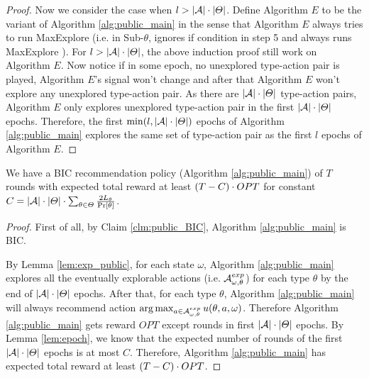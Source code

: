 \begin{proof}
Now we consider the case when $l > |\mathcal{A}| \cdot |\varTheta|$. Define Algorithm $E$ to be the variant of Algorithm \ref{alg:public_main} in the sense that Algorithm $E$ always tries to run MaxExplore (i.e. in Sub-$\theta$, ignores if condition in step 5 and always runs MaxExplore ). For $l > |\mathcal{A}| \cdot |\varTheta|$, the above induction proof still work on Algorithm $E$. Now notice if in some epoch, no unexplored type-action pair is played, Algorithm $E$'s signal won't change and after that Algorithm $E$ won't explore any unexplored type-action pair. As there are $ |\mathcal{A}| \cdot |\varTheta|$ type-action pairs, Algorithm $E$ only explores unexplored type-action pair in the first $ |\mathcal{A}| \cdot |\varTheta|$ epochs. Therefore, the first $\min(l,|\mathcal{A}|\cdot |\varTheta|)$ epochs of Algorithm \ref{alg:public_main} explores the same set of type-action pair as the first $l$ epochs of Algorithm $E$.
\end{proof}

\begin{corollary}
\label{cor:public}
We have a BIC recommendation policy (Algorithm \ref{alg:public_main}) of $T$ rounds with expected total reward at least $\left(T - C \right) \cdot OPT$ for constant $C = |\mathcal{A}| \cdot |\varTheta| \cdot \sum_{\theta\in\varTheta} \frac{2L_{\theta}}{\Pr[\theta]}$. 
\end{corollary}

\begin{proof}
First of all, by Claim \ref{clm:public_BIC}, Algorithm \ref{alg:public_main} is BIC. 

By Lemma \ref{lem:exp_public}, for each state $\omega$, Algorithm \ref{alg:public_main} explores all the eventually explorable actions (i.e. $\mathcal{A}_{\omega,\theta}^{exp}$) for each type $\theta$ by the end of $|\mathcal{A}|\cdot |\varTheta|$ epochs. After that, for each type $\theta$, Algorithm \ref{alg:public_main} will always recommend action $ \arg\max_{a \in \mathcal{A}_{\omega,\theta}^{exp}} u(\theta, a, \omega)$. Therefore Algorithm \ref{alg:public_main} gets reward $OPT$ except rounds in first $|\mathcal{A}|\cdot |\varTheta|$ epochs. By Lemma \ref{lem:epoch}, we know that the expected number of rounds of the first  $|\mathcal{A}|\cdot |\varTheta|$ epochs is at most $C$. Therefore, Algorithm \ref{alg:public_main} has expected total reward at least  $\left(T - C \right) \cdot OPT$.

\end{proof}